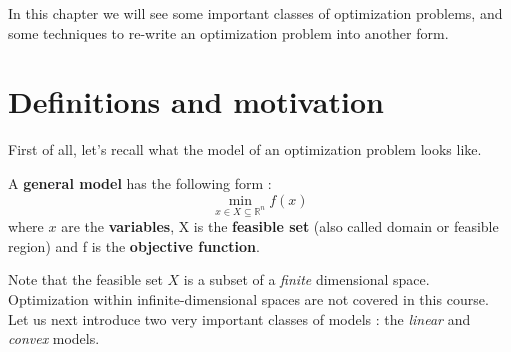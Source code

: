 %
%
%
%
%
%
%
%

In this chapter we will see some important classes of optimization problems, and some techniques to re-write an optimization problem into another form.

\section{Definitions and motivation}
First of all, let's recall what the model of an optimization problem looks like.\\

\begin{definition}
A \textbf{general model} has the following form :
\begin{equation}
\min_{x \in X \subseteq \mathbb{R}^n} f(x)
\end{equation}
where $x$ are the \textbf{variables}, X is the \textbf{feasible set} (also called domain or feasible region) and f is the \textbf{objective function}.
\end{definition}

Note that the feasible set $X$ is a subset of a \textit{finite} dimensional space. Optimization within infinite-dimensional spaces are not covered in this course.\\

Let us next introduce two very important classes of models : the \textit{linear} and \textit{convex} models.\\

